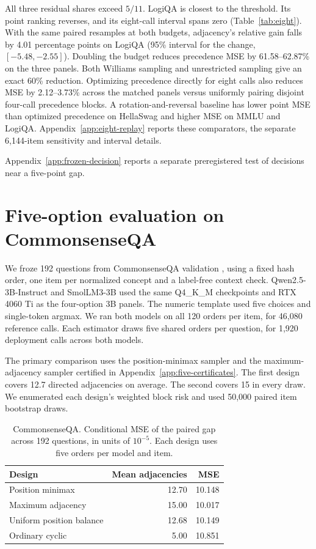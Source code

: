 \documentclass{article}
\begin{document}
All three residual shares exceed $5/11$. LogiQA is closest to the
threshold. Its point ranking reverses, and its eight-call interval spans
zero (Table~\ref{tab:eight}). With the same paired resamples at both
budgets, adjacency's relative gain falls by 4.01 percentage points
on LogiQA (95\% interval for the change, $[-5.48,-2.55]$).
Doubling the budget reduces precedence MSE by 61.58--62.87\% on
the three panels. Both Williams sampling and unrestricted sampling
give an exact 60\% reduction. Optimizing precedence directly for
eight calls also reduces MSE by
2.12--3.73\% across the matched panels versus uniformly pairing
disjoint four-call precedence blocks. A rotation-and-reversal baseline
has lower point MSE than optimized precedence on HellaSwag and higher
MSE on MMLU and LogiQA. Appendix~\ref{app:eight-replay} reports these
comparators, the separate 6,144-item sensitivity and interval details.



Appendix~\ref{app:frozen-decision} reports a separate preregistered test of decisions near a five-point gap.


\section{Five-option evaluation on CommonsenseQA}
We froze 192 questions from CommonsenseQA validation
\citep{talmor2019commonsenseqa}, using a fixed hash order,
one item per normalized concept and a label-free context check.
Qwen2.5-3B-Instruct and SmolLM3-3B used the same Q4\_K\_M
checkpoints and RTX 4060 Ti as the four-option 3B panels.
The numeric template used five choices and single-token argmax.
We ran both models on all 120 orders per item, for 46,080
reference calls. Each estimator draws five shared orders per
question, for 1,920 deployment calls across both models.

The primary comparison uses the position-minimax sampler and the
maximum-adjacency sampler certified in Appendix~\ref{app:five-certificates}.
The first design covers 12.7 directed adjacencies on average.
The second covers 15 in every draw. We enumerated each design's
weighted block risk and used 50,000 paired item bootstrap draws.

\begin{table}[t]
\centering
\small
\caption{CommonsenseQA. Conditional MSE of the paired gap across
192 questions, in units of $10^{-5}$. Each design uses five
orders per model and item.}
\label{tab:commonsenseqa-five}
\begin{tabular}{lrr}
\toprule
Design & Mean adjacencies & MSE \\
\midrule
Position minimax & 12.70 & 10.148 \\
Maximum adjacency & 15.00 & 10.017 \\
Uniform position balance & 12.68 & 10.149 \\
Ordinary cyclic & 5.00 & 10.851 \\
\bottomrule
\end{tabular}
\end{table}
\end{document}

